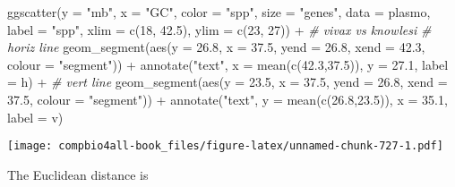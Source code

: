 \documentclass[
]{book}
\newenvironment{Shaded}{\begin{snugshade}}{\end{snugshade}}
\newcommand{\AttributeTok}[1]{\textcolor[rgb]{0.77,0.63,0.00}{#1}}
\newcommand{\CommentTok}[1]{\textcolor[rgb]{0.56,0.35,0.01}{\textit{#1}}}
\newcommand{\DecValTok}[1]{\textcolor[rgb]{0.00,0.00,0.81}{#1}}
\newcommand{\FloatTok}[1]{\textcolor[rgb]{0.00,0.00,0.81}{#1}}
\newcommand{\FunctionTok}[1]{\textcolor[rgb]{0.00,0.00,0.00}{#1}}
\newcommand{\NormalTok}[1]{#1}
\newcommand{\SpecialCharTok}[1]{\textcolor[rgb]{0.00,0.00,0.00}{#1}}
\newcommand{\StringTok}[1]{\textcolor[rgb]{0.31,0.60,0.02}{#1}}
\begin{document}
\begin{Shaded}
\begin{Highlighting}[]
\FunctionTok{ggscatter}\NormalTok{(}\AttributeTok{y =} \StringTok{"mb"}\NormalTok{,}
          \AttributeTok{x =} \StringTok{"GC"}\NormalTok{,}
          \AttributeTok{color =} \StringTok{"spp"}\NormalTok{,}
          \AttributeTok{size =} \StringTok{"genes"}\NormalTok{,}
          \AttributeTok{data =}\NormalTok{ plasmo,}
          \AttributeTok{label =} \StringTok{"spp"}\NormalTok{,}
          \AttributeTok{xlim =} \FunctionTok{c}\NormalTok{(}\DecValTok{18}\NormalTok{, }\FloatTok{42.5}\NormalTok{),}
          \AttributeTok{ylim =} \FunctionTok{c}\NormalTok{(}\DecValTok{23}\NormalTok{, }\DecValTok{27}\NormalTok{)) }\SpecialCharTok{+}
    \CommentTok{\# vivax vs knowlesi}
   \CommentTok{\# horiz line}
   \FunctionTok{geom\_segment}\NormalTok{(}\FunctionTok{aes}\NormalTok{(}\AttributeTok{y    =} \FloatTok{26.8}\NormalTok{,    }\AttributeTok{x =} \FloatTok{37.5}\NormalTok{,}
                   \AttributeTok{yend =} \FloatTok{26.8}\NormalTok{, }\AttributeTok{xend =} \FloatTok{42.3}\NormalTok{,}
                   \AttributeTok{colour =} \StringTok{"segment"}\NormalTok{)) }\SpecialCharTok{+}
  \FunctionTok{annotate}\NormalTok{(}\StringTok{"text"}\NormalTok{,}
           \AttributeTok{x =} \FunctionTok{mean}\NormalTok{(}\FunctionTok{c}\NormalTok{(}\FloatTok{42.3}\NormalTok{,}\FloatTok{37.5}\NormalTok{)), }
           \AttributeTok{y =} \FloatTok{27.1}\NormalTok{,}
           \AttributeTok{label =}\NormalTok{ h) }\SpecialCharTok{+}
  \CommentTok{\# vert line}
   \FunctionTok{geom\_segment}\NormalTok{(}\FunctionTok{aes}\NormalTok{(}\AttributeTok{y    =} \FloatTok{23.5}\NormalTok{,    }\AttributeTok{x =} \FloatTok{37.5}\NormalTok{,}
                   \AttributeTok{yend =} \FloatTok{26.8}\NormalTok{, }\AttributeTok{xend =} \FloatTok{37.5}\NormalTok{,}
                   \AttributeTok{colour =} \StringTok{"segment"}\NormalTok{)) }\SpecialCharTok{+}
    \FunctionTok{annotate}\NormalTok{(}\StringTok{"text"}\NormalTok{,}
           \AttributeTok{y =} \FunctionTok{mean}\NormalTok{(}\FunctionTok{c}\NormalTok{(}\FloatTok{26.8}\NormalTok{,}\FloatTok{23.5}\NormalTok{)), }
           \AttributeTok{x =} \FloatTok{35.1}\NormalTok{,}
           \AttributeTok{label =}\NormalTok{ v) }
\end{Highlighting}
\end{Shaded}

\texttt{[image: compbio4all-book\_files/figure-latex/unnamed-chunk-727-1.pdf]}

The Euclidean distance is
\end{document}
